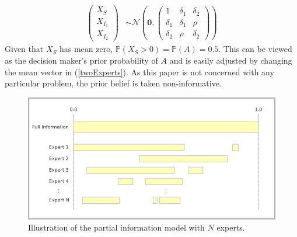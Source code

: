 \documentclass[11pt,twoside]{article}
\renewcommand{\P}{\mathbb{P}}
\theoremstyle{definition}
\theoremstyle{definition}
\begin{document}
\begin{align}
\left(\begin{matrix} X_S \\ X_{I_1}\\ X_{I_2} \end{matrix}\right) &\sim \mathcal{N}\left(
 \boldsymbol{0},  \left(\begin{matrix} 
1 & \delta_1 & \delta_2\\
\delta_1 & \delta_1 &\rho\\
\delta_2 & \rho & \delta_2
 \end{matrix}\right)\right) \label{twoExperts}
\end{align}
Given that $X_S$ has mean zero, $\P(X_S > 0) = \P(A) = 0.5$. This can be viewed as the decision maker's prior probability of $A$ and is easily adjusted by changing the mean vector in (\ref{twoExperts}). As this paper is not concerned with any particular problem, the prior belief is taken non-informative.

\begin{figure}[htbp]
   \includegraphics[width = \textwidth]{N=N} %
   \caption{Illustration of the partial information model with $N$ experts.}
   \label{diagramN}
\end{figure}
\end{document}
